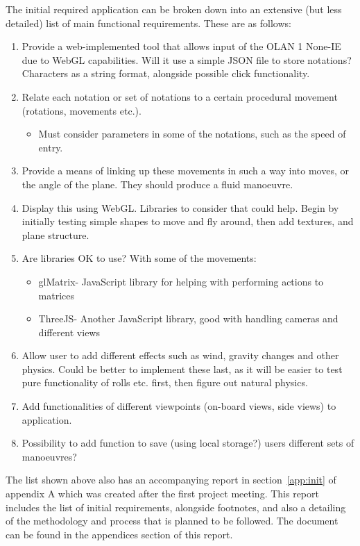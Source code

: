 \noindent The initial required application can be broken down into an extensive (but less detailed) list of main functional requirements. These are as follows:
\begin{enumerate}
	\item Provide a web-implemented tool that allows input of the OLAN 1 None-IE due to WebGL capabilities. Will it use a simple JSON file to store notations? Characters as a string format, alongside possible click functionality.
	\item Relate each notation or set of notations to a certain procedural movement (rotations, movements etc.). 
		\begin{itemize}
			\item Must consider parameters in some of the notations, such as the speed of entry.
		\end{itemize}
	\item Provide a means of linking up these movements in such a way into moves, or the angle of the plane. They should produce a fluid manoeuvre.
	\item Display this using WebGL. Libraries to consider that could help. Begin by initially testing simple shapes to move and fly around, then add textures, and plane structure.
	\item Are libraries OK to use? With some of the movements:
		\begin{itemize}
			\item glMatrix- JavaScript library for helping with performing actions to matrices\cite{GlMatrix}
			\item ThreeJS- Another JavaScript library, good with handling cameras and different views\cite{ThreeJs}
		\end{itemize}
	\item Allow user to add different effects such as wind, gravity changes and other physics. Could be better to implement these last, as it will be easier to test pure functionality of rolls etc. first, then figure out natural physics.
	\item Add functionalities of different viewpoints (on-board views, side views) to application.
	\item Possibility to add function to save (using local storage?) users different sets of manoeuvres?
\end{enumerate}

The list shown above also has an accompanying report in section~\ref{app:init} of appendix A which was created after the first project meeting. This report includes the list of initial requirements, alongside footnotes, and also a detailing of the methodology and process that is planned to be followed. The document can be found in the appendices section of this report. 

